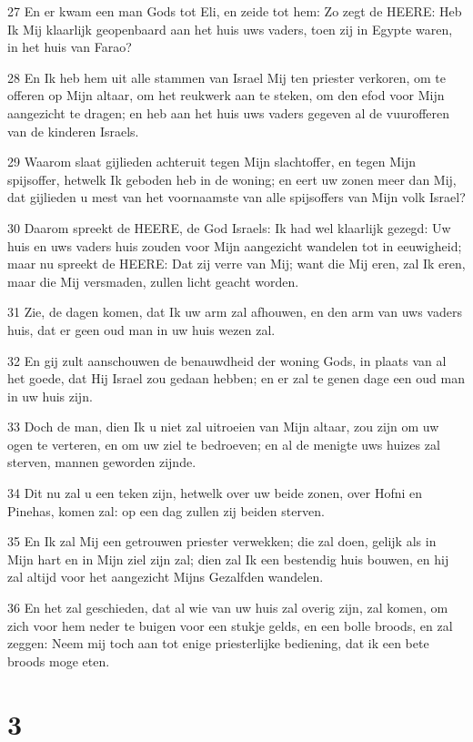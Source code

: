 \par 27 En er kwam een man Gods tot Eli, en zeide tot hem: Zo zegt de HEERE: Heb Ik Mij klaarlijk geopenbaard aan het huis uws vaders, toen zij in Egypte waren, in het huis van Farao?
\par 28 En Ik heb hem uit alle stammen van Israel Mij ten priester verkoren, om te offeren op Mijn altaar, om het reukwerk aan te steken, om den efod voor Mijn aangezicht te dragen; en heb aan het huis uws vaders gegeven al de vuurofferen van de kinderen Israels.
\par 29 Waarom slaat gijlieden achteruit tegen Mijn slachtoffer, en tegen Mijn spijsoffer, hetwelk Ik geboden heb in de woning; en eert uw zonen meer dan Mij, dat gijlieden u mest van het voornaamste van alle spijsoffers van Mijn volk Israel?
\par 30 Daarom spreekt de HEERE, de God Israels: Ik had wel klaarlijk gezegd: Uw huis en uws vaders huis zouden voor Mijn aangezicht wandelen tot in eeuwigheid; maar nu spreekt de HEERE: Dat zij verre van Mij; want die Mij eren, zal Ik eren, maar die Mij versmaden, zullen licht geacht worden.
\par 31 Zie, de dagen komen, dat Ik uw arm zal afhouwen, en den arm van uws vaders huis, dat er geen oud man in uw huis wezen zal.
\par 32 En gij zult aanschouwen de benauwdheid der woning Gods, in plaats van al het goede, dat Hij Israel zou gedaan hebben; en er zal te genen dage een oud man in uw huis zijn.
\par 33 Doch de man, dien Ik u niet zal uitroeien van Mijn altaar, zou zijn om uw ogen te verteren, en om uw ziel te bedroeven; en al de menigte uws huizes zal sterven, mannen geworden zijnde.
\par 34 Dit nu zal u een teken zijn, hetwelk over uw beide zonen, over Hofni en Pinehas, komen zal: op een dag zullen zij beiden sterven.
\par 35 En Ik zal Mij een getrouwen priester verwekken; die zal doen, gelijk als in Mijn hart en in Mijn ziel zijn zal; dien zal Ik een bestendig huis bouwen, en hij zal altijd voor het aangezicht Mijns Gezalfden wandelen.
\par 36 En het zal geschieden, dat al wie van uw huis zal overig zijn, zal komen, om zich voor hem neder te buigen voor een stukje gelds, en een bolle broods, en zal zeggen: Neem mij toch aan tot enige priesterlijke bediening, dat ik een bete broods moge eten.

\chapter{3}


